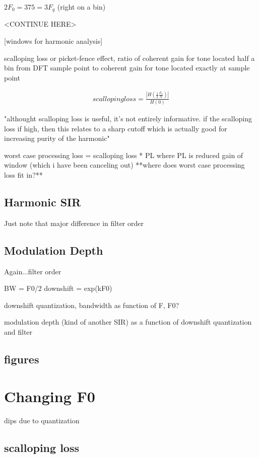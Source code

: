 \documentclass [11pt, proquest] {uwthesis}[2015/03/03]
\begin{document}
$2F_0 = 375 = 3 F_q$ (right on a bin)

<CONTINUE HERE>

[windows for harmonic analysis]

scalloping loss or picket-fence effect, ratio of coherent gain for tone located half a bin from DFT sample point to coherent gain for tone located exactly at sample point

\begin{align}
scalloping loss = \frac{| H(\frac{1}{2} \frac{F_s}{N}) |}{H(0)}
\end{align}

"althought scalloping loss is useful, it's not entirely informative.  if the scalloping loss if high, then this relates to a sharp cutoff which is actually good for increasing purity of the harmonic"

worst case processing loss = scalloping loss * PL
where PL is reduced gain of window (which i have been canceling out)
**where does worst case processing loss fit in?**

\subsection{Harmonic SIR}

Just note that major difference in filter order

\subsection{Modulation Depth}

Again...filter order

BW = F0/2
downshift = exp(kF0)

downshift quantization, bandwidth as function of F, F0?

modulation depth (kind of another SIR) as a function of downshift quantization and filter

\subsection{figures}

\section{Changing F0}

dips due to quantization

\subsection{scalloping loss}
\end{document}
